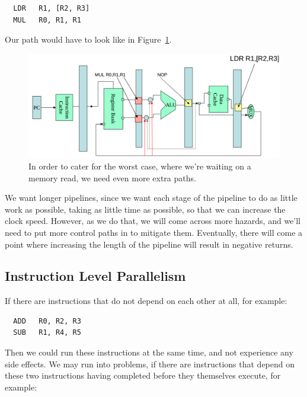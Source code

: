 \begin{verbatim}
  LDR   R1, [R2, R3]
  MUL   R0, R1, R1
\end{verbatim}

Our path would have to look like in Figure~\ref{more-extra-paths}.


\begin{figure}[h!]
  \centering
  \includegraphics[width=\textwidth]{images/more-extra-paths}
  \caption{In order to cater for the worst case, where we're waiting on a memory
  read, we need even more extra paths.}
  \label{more-extra-paths}
\end{figure}

We want longer pipelines, since we want each stage of the pipeline to do as
little work as possible, taking as little time as possible, so that we can
increase the clock speed. However, as we do that, we will come across more
hazards, and we'll need to put more control paths in to mitigate them.
Eventually, there will come a point where increasing the length of the pipeline
will result in negative returns.

\subsection{Instruction Level Parallelism}

If there are instructions that do not depend on each other at all, for example:

\begin{verbatim}
  ADD   R0, R2, R3
  SUB   R1, R4, R5
\end{verbatim}

Then we could run these instructions at the same time, and not experience any
side effects. We may run into problems, if there are instructions that depend on
these two instructions having completed before they themselves execute, for
example:

